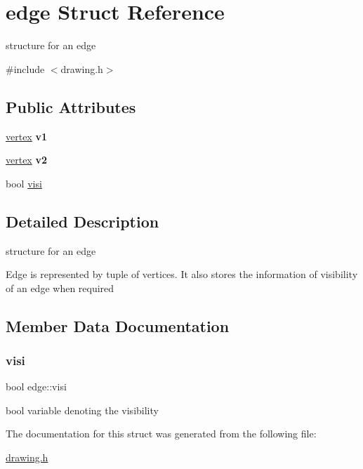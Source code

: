 \hypertarget{structedge}{}\section{edge Struct Reference}
\label{structedge}


structure for an edge  




{\ttfamily \#include $<$drawing.\+h$>$}

\subsection*{Public Attributes}
\begin{DoxyCompactItemize}
\item 
\mbox{\label{structedge_a0209c03c9479528b2e060d4d0e58b461}} 
\mbox{\hyperlink{structvertex}{vertex}} {\bfseries v1}
\item 
\mbox{\label{structedge_a5b849de3794f7e5126fc8f03199d568c}} 
\mbox{\hyperlink{structvertex}{vertex}} {\bfseries v2}
\item 
bool \mbox{\hyperlink{structedge_a54ab8c55c0ae9afc90ca387753a9dbee}{visi}}
\end{DoxyCompactItemize}


\subsection{Detailed Description}
structure for an edge 

Edge is represented by tuple of vertices. It also stores the information of visibility of an edge when required 

\subsection{Member Data Documentation}
\mbox{\label{structedge_a54ab8c55c0ae9afc90ca387753a9dbee}} 
\subsubsection{\texorpdfstring{visi}{visi}}
{\footnotesize\ttfamily bool edge\+::visi}

bool variable denoting the visibility 

The documentation for this struct was generated from the following file\+:\begin{DoxyCompactItemize}
\item 
\mbox{\hyperlink{drawing_8h}{drawing.\+h}}\end{DoxyCompactItemize}
